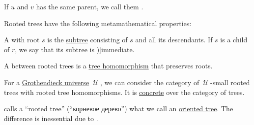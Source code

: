 \begin{definition}
\begin{thmenum}
     If \( u \) and \( v \) has the same parent, we call them .
  \end{thmenum}

  Rooted trees have the following metamathematical properties:
  \begin{thmenum}[resume=def:rooted_tree]
     A  with root \( s \) is the \hyperref[def:tree/subtree]{subtree} consisting of \( s \) and all its descendants. If \( s \) is a child of \( r \), we say that its subtree is \term[en=subtree of the root (\cite[308]{Stanley2012CombinatoricsVol1})]{immediate}.

    \mimprovised A  between rooted trees is a \hyperref[def:tree/homomorphism]{tree homomorphism} that preserves roots.

    \mimprovised For a \hyperref[def:grothendieck_universe]{Grothendieck universe} \( \mscrU \), we can consider the category of \( \mscrU \)-small rooted trees with rooted tree homomorphisms. It is \hyperref[def:concrete_category]{concrete} over the category of trees.
  \end{thmenum}
\end{definition}
\begin{comments}
  \item {} calls a \enquote{rooted tree} (\enquote{корневое дерево}) what we call an \hyperref[def:oriented_tree]{oriented tree}. The difference is inessential due to .
\end{comments}

